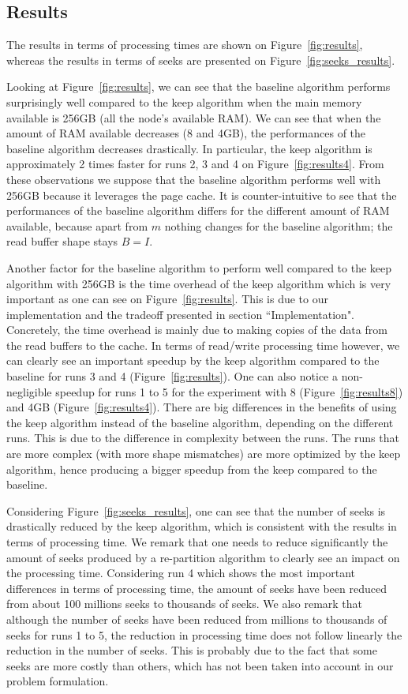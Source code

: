 \documentclass[sigconf, nonacm]{acmart}
\begin{document}
\subsection{Results}

The results in terms of processing times are shown on
Figure~\ref{fig:results}, whereas the results in terms of seeks are
presented on Figure~\ref{fig:seeks_results}.

Looking at Figure~\ref{fig:results}, we can see that
the baseline algorithm performs surprisingly well compared to the keep algorithm
when the main memory available is 256GB (all the node's available RAM).
We can see that when the amount of RAM available decreases (8 and 4GB), the
performances of the baseline algorithm decreases drastically.
In particular, the keep algorithm is approximately 2 times faster for runs
2, 3 and 4 on Figure~\ref{fig:results4}.
From these observations we suppose that the baseline algorithm performs well
with 256GB because it leverages the page cache.
It is counter-intuitive to see that the performances of the baseline algorithm
differs for the different amount of RAM available, because apart from $m$
nothing changes for the baseline algorithm; the read buffer shape stays $B=I$.

Another factor for the baseline algorithm to perform well compared to the
keep algorithm with 256GB is the time overhead of the keep algorithm which is
very important as one can see on Figure~\ref{fig:results}.
This is due to our implementation and the tradeoff presented in section
``Implementation".
Concretely, the time overhead is mainly due to making copies of the data from
the read buffers to the cache.
In terms of read/write processing time however, we can clearly see an
important speedup by the keep algorithm compared to the baseline for
runs 3 and 4 (Figure~\ref{fig:results}).
One can also notice a non-negligible speedup for runs 1 to 5 for the experiment
with 8 (Figure~\ref{fig:results8}) and 4GB (Figure~\ref{fig:results4}).
There are big differences in the benefits of using the keep algorithm instead of
the baseline algorithm, depending on the different runs.
This is due to the difference in complexity between the runs.
The runs that are more complex (with more shape mismatches) are more optimized
by the keep algorithm, hence producing a bigger speedup from the keep compared to
the baseline.

Considering Figure~\ref{fig:seeks_results}, one can see that the number of
seeks is drastically reduced by the keep algorithm, which is consistent with
the results in terms of processing time.
We remark that one needs to reduce significantly the amount of seeks produced
by a re-partition algorithm to clearly see an impact on the processing time.
Considering run 4 which shows the most important differences in terms of
processing time, the amount of seeks have been reduced from about 100 millions
seeks to thousands of seeks.
We also remark that although the number of seeks have been reduced from millions
to thousands of seeks for runs 1 to 5, the reduction in processing time does not
follow linearly the reduction in the number of seeks.
This is probably due to the fact that some seeks are more costly than others,
which has not been taken into account in our problem formulation.
\end{document}
